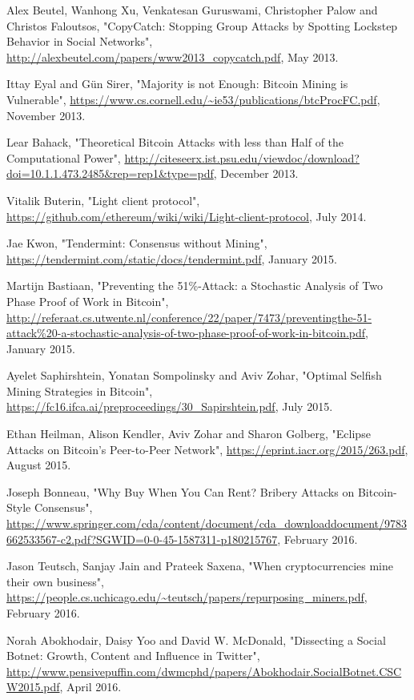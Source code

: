\documentclass[12pt,a4paper]{article}
\begin{document}
\begin{thebibliography}{9}
Alex Beutel, Wanhong Xu, Venkatesan Guruswami, Christopher Palow and Christos Faloutsos,
"CopyCatch: Stopping Group Attacks by Spotting Lockstep Behavior in Social Networks",
\url{http://alexbeutel.com/papers/www2013_copycatch.pdf},
May 2013.

Ittay Eyal and Gün Sirer,
"Majority is not Enough: Bitcoin Mining is Vulnerable",
\url{https://www.cs.cornell.edu/~ie53/publications/btcProcFC.pdf},
November 2013.

Lear Bahack,
"Theoretical Bitcoin Attacks with less than Half of the Computational Power",
\url{http://citeseerx.ist.psu.edu/viewdoc/download?doi=10.1.1.473.2485&rep=rep1&type=pdf},
December 2013.

Vitalik Buterin,
"Light client protocol",
\url{https://github.com/ethereum/wiki/wiki/Light-client-protocol},
July 2014.

Jae Kwon,
"Tendermint: Consensus without Mining",
\url{https://tendermint.com/static/docs/tendermint.pdf},
January 2015.

Martijn Bastiaan,
"Preventing the 51\%-Attack: a Stochastic Analysis of Two Phase Proof of Work in Bitcoin",
\url{http://referaat.cs.utwente.nl/conference/22/paper/7473/preventingthe-51-attack%20-a-stochastic-analysis-of-two-phase-proof-of-work-in-bitcoin.pdf},
January 2015.

Ayelet Saphirshtein, Yonatan Sompolinsky and Aviv Zohar,
"Optimal Selfish Mining Strategies in Bitcoin",
\url{https://fc16.ifca.ai/preproceedings/30_Sapirshtein.pdf},
July 2015.

Ethan Heilman, Alison Kendler, Aviv Zohar and Sharon Golberg,
"Eclipse Attacks on Bitcoin’s Peer-to-Peer Network",
\url{https://eprint.iacr.org/2015/263.pdf},
August 2015.

Joseph Bonneau,
"Why Buy When You Can Rent? Bribery Attacks on Bitcoin-Style Consensus",
\url{https://www.springer.com/cda/content/document/cda_downloaddocument/9783662533567-c2.pdf?SGWID=0-0-45-1587311-p180215767},
February 2016.

Jason Teutsch, Sanjay Jain and Prateek Saxena,
"When cryptocurrencies mine their own business",
\url{https://people.cs.uchicago.edu/~teutsch/papers/repurposing_miners.pdf},
February 2016.

Norah Abokhodair, Daisy Yoo and David W. McDonald,
"Dissecting a Social Botnet: Growth, Content and Influence in Twitter",
\url{http://www.pensivepuffin.com/dwmcphd/papers/Abokhodair.SocialBotnet.CSCW2015.pdf},
April 2016.


\end{thebibliography}
\end{document}
